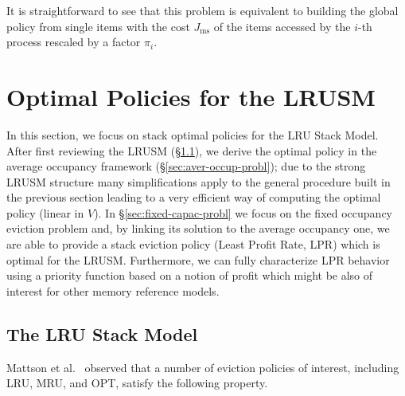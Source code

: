 \documentclass[11pt,a4paper]{article}
\DeclareMathOperator{\ms}{ms}
\theoremstyle{definition}
\theoremstyle{remark}
\begin{document}
It is straightforward to see that this problem is equivalent to building the
global policy from single items with the cost $J_{\ms}$ of the items accessed by
the $i$-th process rescaled by a factor $\pi_i$.


\section{Optimal Policies for the LRUSM}
\label{lrusm}

In this section, we focus on stack optimal policies for the LRU Stack
Model.  After first reviewing the LRUSM (\S\ref{sec:lru-stack-model}),
we derive the optimal policy in the average occupancy framework
(\S\ref{sec:aver-occup-probl}); due to the strong LRUSM structure many
simplifications apply to the general procedure built in the previous
section leading to a very efficient way of computing the optimal
policy (linear in $V$). In \S\ref{sec:fixed-capac-probl} we focus on
the fixed occupancy eviction problem and, by linking its solution to
the average occupancy one, we are able to provide a stack eviction
policy (Least Profit Rate, LPR) which is optimal for the
LRUSM. Furthermore, we can fully characterize LPR behavior using a
priority function based on a notion of profit which might be also of
interest for other memory reference models.

\subsection{The LRU Stack Model}
\label{sec:lru-stack-model}





Mattson et al.\ \cite{MattsonGST70} observed that a number of
eviction policies of interest, including LRU, MRU, and OPT, satisfy
the following property.
\end{document}
